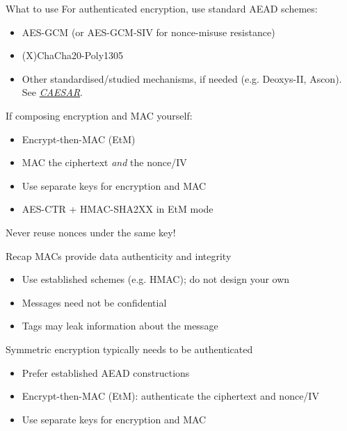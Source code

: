 \begin{frame}{What to use}
  For authenticated encryption, use standard AEAD schemes:
  \begin{itemize}[<+(1)->]
    \item AES-GCM {\scriptsize(or AES-GCM-SIV for nonce-misuse resistance)}
    \item (X)ChaCha20-Poly1305
    \item {\scriptsize Other standardised/studied mechanisms, if needed (e.g. Deoxys-II, Ascon). See \href{https://competitions.cr.yp.to/caesar-submissions.html}{\textit{CAESAR}}.}
  \end{itemize}

  \vspace*{0.5em}

  \pause
  If composing encryption and MAC yourself:
  \begin{itemize}[<+(1)->]
    \item Encrypt-then-MAC (EtM)
    \item MAC the ciphertext \emph{and} the nonce/IV
    \item Use separate keys for encryption and MAC
    \item AES-CTR + HMAC-SHA2XX in EtM mode
  \end{itemize}

  \vspace*{0.5em}

  \pause
  Never reuse nonces under the same key!
\end{frame}

\begin{frame}{Recap}
  MACs provide data authenticity and integrity
  \begin{itemize}[<+(1)->]
    \item Use established schemes (e.g. HMAC); do not design your own
    \item Messages need not be confidential
    \item Tags may leak information about the message
  \end{itemize}

  \vspace*{1em}

  \pause
  Symmetric encryption typically needs to be authenticated
  \begin{itemize}[<+(1)->]
    \item Prefer established AEAD constructions
    \item Encrypt-then-MAC (EtM): authenticate the ciphertext and nonce/IV
    \item Use separate keys for encryption and MAC
  \end{itemize}
\end{frame}


